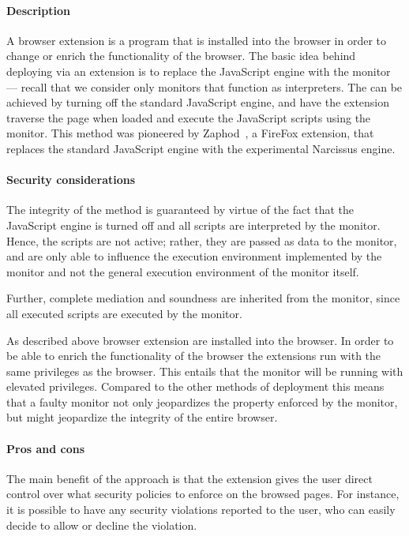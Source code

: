 \documentclass{llncs}
\begin{document}
\paragraph{Description}

A browser extension is a program that is installed into the browser in order to
change or enrich the functionality of the browser.  The basic idea behind
deploying via an extension is to replace the JavaScript engine with the monitor
--- recall that we consider only monitors that function as interpreters. The
can be achieved by turning off the standard JavaScript engine, and have the
extension traverse the page when loaded and execute the JavaScript scripts
using the monitor.  This method was pioneered by Zaphod~\cite{Zaphod}, a
FireFox extension, that replaces the standard JavaScript engine with the
experimental Narcissus engine.

\paragraph{Security considerations}

The integrity of the method is guaranteed by virtue of the fact that the
JavaScript engine is turned off and all scripts are interpreted by the monitor.
Hence, the scripts are not active; rather, they are passed as data to the
monitor, and are only able to influence the execution environment implemented
by the monitor and not the general execution environment of the monitor itself.

Further, complete mediation and soundness are inherited from the monitor, since
all executed scripts are executed by the monitor.


As described above browser extension are installed into the browser. In order
to be able to enrich the functionality of the browser the extensions run with
the same privileges as the browser. This entails that the monitor will be
running with elevated privileges.  Compared to the other methods of deployment
this means that a faulty monitor not only jeopardizes the property enforced by
the monitor, but might jeopardize the integrity of the entire browser.

\paragraph{Pros and cons}

The main benefit of the approach is that the extension gives the user direct
control over what security policies to enforce on the browsed pages. For
instance, it is possible to have any security violations reported to the user,
who can easily decide to allow or decline the violation. 
\end{document}
